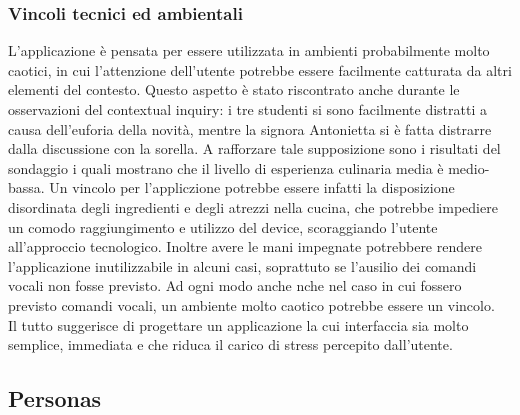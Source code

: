 \subsubsection{Vincoli tecnici ed ambientali}
L'applicazione è pensata per essere utilizzata in ambienti probabilmente
molto caotici, in cui l'attenzione dell'utente potrebbe essere
facilmente catturata da altri elementi del contesto. Questo aspetto è
stato riscontrato anche durante le osservazioni del contextual inquiry:
i tre studenti si sono facilmente distratti a causa dell'euforia della
novità, mentre la signora Antonietta si è fatta distrarre dalla
discussione con la sorella. A rafforzare tale supposizione sono i
risultati del sondaggio i quali mostrano che il livello di esperienza
culinaria media è medio-bassa.
Un vincolo per l'appliczione
potrebbe essere infatti la disposizione disordinata degli ingredienti
e degli atrezzi nella cucina, che potrebbe impediere un comodo
raggiungimento e utilizzo del
device, scoraggiando l'utente all'approccio tecnologico. Inoltre
avere le mani impegnate potrebbere rendere l'applicazione inutilizzabile
in alcuni casi, soprattuto se l'ausilio dei comandi vocali non fosse
previsto. Ad ogni modo anche nche nel caso in cui fossero previsto comandi vocali,
un ambiente molto caotico potrebbe essere un vincolo.\\
Il tutto suggerisce di progettare un applicazione la cui interfaccia sia
molto semplice, immediata e che riduca il carico di stress
percepito dall'utente.
\subsection{Personas}

